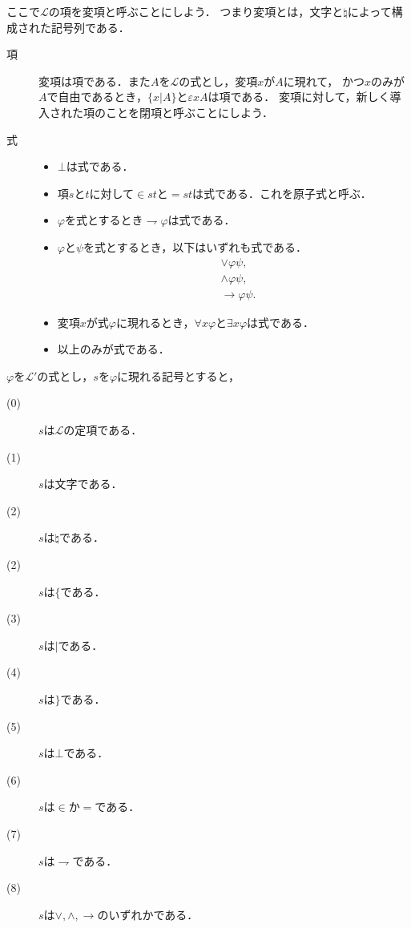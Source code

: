 \documentclass[a4j,10.5pt,oneside,openany]{jsbook}
\theoremstyle{mystyle}
\begin{document}
	ここで$\mathcal{L}$の項を変項と呼ぶことにしよう．
	つまり変項とは，文字と$\natural$によって構成された記号列である．
	
	\begin{description}
		\item[項] 変項は項である．また$A$を$\mathcal{L}$の式とし，変項$x$が$A$に現れて，
			かつ$x$のみが$A$で自由であるとき，$\{x|A\}$と$\varepsilon x A$は項である．
			変項に対して，新しく導入された項のことを閉項と呼ぶことにしよう．
			
		\item[式] 
			\begin{itemize}
				\item $\bot$は式である．
				\item 項$s$と$t$に対して$\in st$と$=st$は式である．これを原子式と呼ぶ．
				\item $\varphi$を式とするとき$\rightharpoondown \varphi$は式である．
				\item $\varphi$と$\psi$を式とするとき，以下はいずれも式である．
					\begin{align}
						&\vee \varphi \psi, \\
						&\wedge \varphi \psi, \\
						&\rightarrow \varphi \psi.
					\end{align}
			
				\item 変項$x$が式$\varphi$に現れるとき，$\forall x \varphi$と$\exists x \varphi$は式である．
			
				\item 以上のみが式である．
		\end{itemize}
	\end{description}
	
	$\varphi$を$\mathcal{L}'$の式とし，$s$を$\varphi$に現れる記号とすると，
	\begin{description}
		\item[(0)] $s$は$\mathcal{L}$の定項である．
		\item[(1)] $s$は文字である．
		\item[(2)] $s$は$\natural$である．
		\item[(2)] $s$は$\{$である．
		\item[(3)] $s$は$|$である．
		\item[(4)] $s$は$\}$である．
		\item[(5)] $s$は$\bot$である．
		\item[(6)] $s$は$\in$か$=$である．
		\item[(7)] $s$は$\rightharpoondown$である．
		\item[(8)] $s$は$\vee,\wedge,\rightarrow$のいずれかである．
	\end{description}
	
\end{document}
